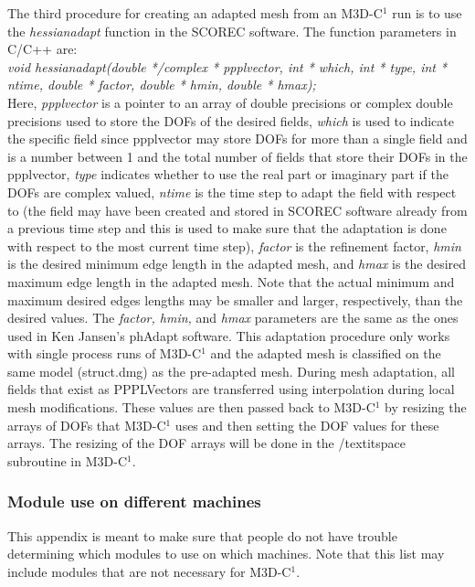 The third procedure for creating an adapted mesh from an M3D-C$^1$ run is to use the 
\textit{hessianadapt} function in the SCOREC software.  The function parameters in C/C++ are:\\
\textit{void hessianadapt(double */complex * ppplvector, int * which, int * type, int * ntime, double * factor, double * hmin, double * hmax);}\\
Here, \textit{ppplvector} is a pointer to an array of double precisions or complex double precisions
used to store the DOFs of the desired fields, \textit{which} is used to indicate the specific field
since ppplvector may store DOFs for more than a single field and is a number between 1 and the total
number of fields that store their DOFs in the ppplvector, 
\textit{type} indicates whether to use the real part or imaginary part if the DOFs are complex valued, 
\textit{ntime} is the time step to adapt the field with respect to (the field may have been created
and stored in SCOREC software already from a previous time step and this is used to make sure that
the adaptation is done with respect to the most current time step),
\textit{factor} is the refinement factor, \textit{hmin} is the desired minimum edge length in the adapted mesh, 
and \textit{hmax} is the desired maximum edge length in the adapted mesh.  Note that the actual
minimum and maximum desired edges lengths may be smaller and larger, respectively, than the
desired values.  The \textit{factor, hmin,} and \textit{hmax} parameters are the same as the ones
used in Ken Jansen's phAdapt software.  This adaptation procedure only works with single process
runs of M3D-C$^1$ and the adapted mesh is classified on the same model (struct.dmg) 
as the pre-adapted mesh.  During mesh adaptation, all fields that exist as PPPLVectors are transferred
using interpolation during local mesh modifications.  These values are then passed back to M3D-C$^1$ by
resizing the arrays of DOFs that M3D-C$^1$ uses and then setting the DOF values for these arrays.  
The resizing of the DOF arrays will be done in the /textit{space} subroutine in M3D-C$^1$.


\subsubsection{Module use on different machines}
This appendix is meant to make sure that people do not have trouble determining which modules to use on 
which machines.  Note that this list may include modules that are not necessary for M3D-C$^1$.

